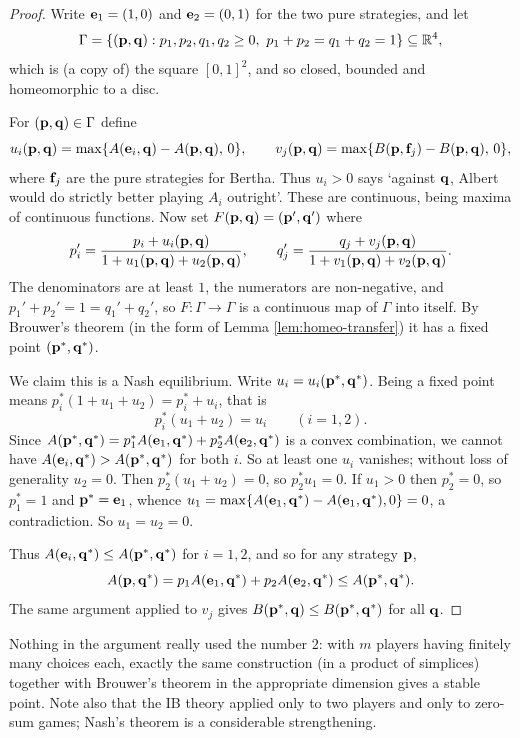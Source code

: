 \documentclass[a4paper]{scrartcl}
\begin{document}
\begin{proof}
	Write $\mathbf{e}_1 = (1,0)$ and $\mathbf{e}_2 = (0,1)$ for the two pure strategies, and let
	$$\Gamma = \{(\mathbf{p},\mathbf{q}) : p_1,p_2,q_1,q_2\geq 0,\ p_1+p_2 = q_1+q_2 = 1\} \subseteq \mathbb{R}^4,$$
	which is (a copy of) the square $[0,1]^2$, and so closed, bounded and homeomorphic to a disc.

	For $(\mathbf{p},\mathbf{q}) \in \Gamma$ define
	$$u_i(\mathbf{p},\mathbf{q}) = \max\{A(\mathbf{e}_i,\mathbf{q}) - A(\mathbf{p},\mathbf{q}),\, 0\}, \qquad v_j(\mathbf{p},\mathbf{q}) = \max\{B(\mathbf{p},\mathbf{f}_j)-B(\mathbf{p},\mathbf{q}),\,0\},$$
	where $\mathbf{f}_j$ are the pure strategies for Bertha. Thus $u_i > 0$ says `against $\mathbf{q}$, Albert would do strictly better playing $A_i$ outright'. These are continuous, being maxima of continuous functions. Now set $F(\mathbf{p},\mathbf{q}) = (\mathbf{p}',\mathbf{q}')$ where
	$$p_i' = \frac{p_i + u_i(\mathbf{p},\mathbf{q})}{1+u_1(\mathbf{p},\mathbf{q})+u_2(\mathbf{p},\mathbf{q})}, \qquad q_j' = \frac{q_j+v_j(\mathbf{p},\mathbf{q})}{1+v_1(\mathbf{p},\mathbf{q})+v_2(\mathbf{p},\mathbf{q})}.$$
	The denominators are at least $1$, the numerators are non-negative, and $p_1'+p_2' = 1 = q_1'+q_2'$, so $F : \Gamma \to \Gamma$ is a continuous map of $\Gamma$ into itself. By Brouwer's theorem (in the form of Lemma \ref{lem:homeo-transfer}) it has a fixed point $(\mathbf{p}^*,\mathbf{q}^*)$.

	We claim this is a Nash equilibrium. Write $u_i = u_i(\mathbf{p}^*,\mathbf{q}^*)$. Being a fixed point means $p_i^*(1+u_1+u_2) = p_i^* + u_i$, that is
	$$p_i^*(u_1+u_2) = u_i \qquad (i=1,2).$$
	Since $A(\mathbf{p}^*,\mathbf{q}^*) = p_1^*A(\mathbf{e}_1,\mathbf{q}^*)+p_2^*A(\mathbf{e}_2,\mathbf{q}^*)$ is a convex combination, we cannot have $A(\mathbf{e}_i,\mathbf{q}^*)>A(\mathbf{p}^*,\mathbf{q}^*)$ for both $i$. So at least one $u_i$ vanishes; without loss of generality $u_2 = 0$. Then $p_2^*(u_1+u_2) = 0$, so $p_2^*u_1 = 0$. If $u_1 > 0$ then $p_2^* = 0$, so $p_1^*=1$ and $\mathbf{p}^* = \mathbf{e}_1$, whence $u_1 = \max\{A(\mathbf{e}_1,\mathbf{q}^*)-A(\mathbf{e}_1,\mathbf{q}^*),0\} = 0$, a contradiction. So $u_1 = u_2 = 0$.

	Thus $A(\mathbf{e}_i,\mathbf{q}^*)\leq A(\mathbf{p}^*,\mathbf{q}^*)$ for $i=1,2$, and so for any strategy $\mathbf{p}$,
	$$A(\mathbf{p},\mathbf{q}^*) = p_1A(\mathbf{e}_1,\mathbf{q}^*)+p_2A(\mathbf{e}_2,\mathbf{q}^*) \leq A(\mathbf{p}^*,\mathbf{q}^*).$$
	The same argument applied to $v_j$ gives $B(\mathbf{p}^*,\mathbf{q})\leq B(\mathbf{p}^*,\mathbf{q}^*)$ for all $\mathbf{q}$.
\end{proof}

Nothing in the argument really used the number $2$: with $m$ players having finitely many choices each, exactly the same construction (in a product of simplices) together with Brouwer's theorem in the appropriate dimension gives a stable point. Note also that the IB theory applied only to two players and only to zero-sum games; Nash's theorem is a considerable strengthening.
\end{document}
